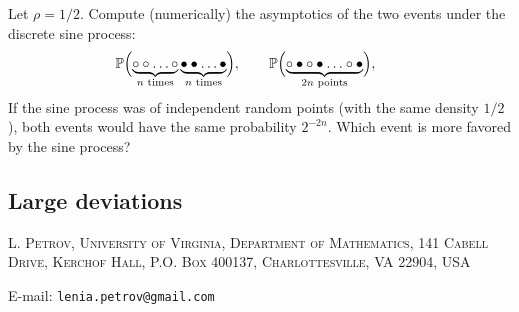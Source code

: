 \documentclass[letterpaper,11pt,oneside,reqno]{article}
\numberwithin{equation}{section}
\theoremstyle{definition}
\begin{document}
Let $\rho=1/2$.
Compute (numerically) the asymptotics of the two events under the discrete sine process:
\begin{equation*}
	\operatorname{\mathbb{P}}
	\Bigl(
		\underbrace{\circ \circ\ldots\circ}_{n\text{ times}}
		\underbrace{\bullet \bullet\ldots\bullet}_{n\text{ times}}
	\Bigr),\qquad
	\operatorname{\mathbb{P}}
	\Bigl(
		\underbrace{\circ\bullet\circ\bullet\ldots\circ\bullet}_{2n\text{ points}}
	\Bigr),\qquad
\end{equation*}
If the sine process was of independent random points (with the same density $1/2$),
both events
would have the same probability $2^{-2n}$.
Which event is more favored by the sine process?

\subsection{Large deviations}
\label{prob:large-deviation}







\medskip

\textsc{L. Petrov, University of Virginia, Department of Mathematics, 141 Cabell Drive, Kerchof Hall, P.O. Box 400137, Charlottesville, VA 22904, USA}

E-mail: \texttt{lenia.petrov@gmail.com}
\end{document}
